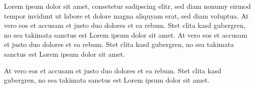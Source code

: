\documentclass{article}
\begin{document}
{}

Lorem ipsum dolor sit amet, consetetur sadipscing elitr, sed diam nonumy
eirmod tempor invidunt ut labore et dolore magna aliquyam erat, sed diam
voluptua.  At vero eos et accusam
et justo duo dolores et ea rebum. Stet clita kasd gubergren, no sea
takimata sanctus est Lorem ipsum dolor sit amet.  At vero eos et accusam et justo duo dolores et ea rebum. Stet
clita kasd gubergren, no sea takimata sanctus est Lorem ipsum dolor sit
amet.

At vero eos et accusam et justo duo
dolores et ea rebum. Stet clita kasd gubergren, no sea takimata sanctus
est Lorem ipsum dolor sit amet.
\end{document}
